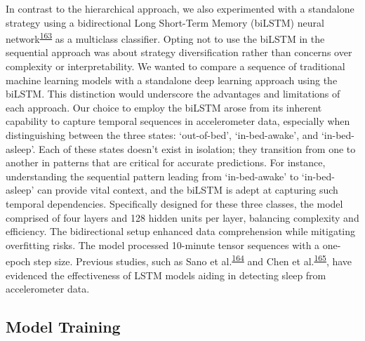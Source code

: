 \documentclass[
  10pt,
]{scrbook}
\begin{document}
In contrast to the hierarchical approach, we also experimented with a
standalone strategy using a bidirectional Long Short-Term Memory
(biLSTM) neural
network\textsuperscript{\protect\hyperlink{ref-hochreiter_long_1997}{163}}
as a multiclass classifier. Opting not to use the biLSTM in the
sequential approach was about strategy diversification rather than
concerns over complexity or interpretability. We wanted to compare a
sequence of traditional machine learning models with a standalone deep
learning approach using the biLSTM. This distinction would underscore
the advantages and limitations of each approach. Our choice to employ
the biLSTM arose from its inherent capability to capture temporal
sequences in accelerometer data, especially when distinguishing between
the three states: `out-of-bed', `in-bed-awake', and `in-bed-asleep'.
Each of these states doesn't exist in isolation; they transition from
one to another in patterns that are critical for accurate predictions.
For instance, understanding the sequential pattern leading from
`in-bed-awake' to `in-bed-asleep' can provide vital context, and the
biLSTM is adept at capturing such temporal dependencies. Specifically
designed for these three classes, the model comprised of four layers and
128 hidden units per layer, balancing complexity and efficiency. The
bidirectional setup enhanced data comprehension while mitigating
overfitting risks. The model processed 10-minute tensor sequences with a
one-epoch step size. Previous studies, such as Sano et
al.\textsuperscript{\protect\hyperlink{ref-sano_multimodal_2019}{164}}
and Chen et
al.\textsuperscript{\protect\hyperlink{ref-chen_attention_2021}{165}},
have evidenced the effectiveness of LSTM models aiding in detecting
sleep from accelerometer data.

\hypertarget{model-training}{%
\subsection{Model Training}\label{model-training}}
\end{document}

